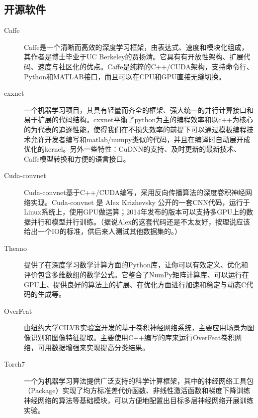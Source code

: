 \documentclass[12pt]{article}
\begin{document}
\subsection{开源软件}
\begin{description}
\item[Caffe] Caffe是一个清晰而高效的深度学习框架，由表达式、速度和模块化组成，其作者是博士毕业于UC Berkeley的贾扬清。它具有有开放性架构、扩展代码、速度与社区化的优点。Caffe是纯粹的C++/CUDA架构，支持命令行、Python和MATLAB接口，而且可以在CPU和GPU直接无缝切换。

\item[cxxnet] 一个机器学习项目，其具有轻量而齐全的框架、强大统一的并行计算接口和易于扩展的代码结构。cxxnet平衡了python为主的编程效率和以c++为核心的为代表的追逐性能，使得我们在不损失效率的前提下可以通过模板编程技术允许开发者编写和matlab/numpy类似的代码，并且在编译时自动展开成优化的kernel。另外一些特性：CuDNN的支持、及时更新的最新技术、Caffe模型转换和方便的语言接口。

\item[Cuda-convnet] Cuda-convnet基于C++/CUDA编写，采用反向传播算法的深度卷积神经网络实现。Cuda-convnet 是 Alex Krizhevsky 公开的一套CNN代码，运行于Linux系统上，使用GPU做运算；2014年发布的版本可以支持多GPU上的数据并行和模型并行训练。（据说Alex的这套代码还是不太友好，按理说应该给出一个IO的标准，供后来人测试其他数据集的。）

\item[Theano] 提供了在深度学习数学计算方面的Python库，让你可以有效定义、优化和评价包含多维数组的数学公式。它整合了NumPy矩阵计算库、可以运行在GPU上、提供良好的算法上的扩展、在优化方面进行加速和稳定与动态C代码的生成等。

\item[OverFeat] 由纽约大学CILVR实验室开发的基于卷积神经网络系统，主要应用场景为图像识别和图像特征提取。主要使用C++编写的库来运行OverFeat卷积网络，可用数据增强来实现提高分类结果。

\item[Torch7] 一个为机器学习算法提供广泛支持的科学计算框架，其中的神经网络工具包（Package）实现了均方标准差代价函数、非线性激活函数和梯度下降训练神经网络的算法等基础模块，可以方便地配置出目标多层神经网络开展训练实验。
\end{description}
\end{document}
